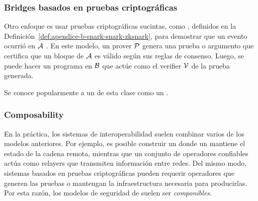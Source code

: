 \subsubsection{Bridges basados en pruebas criptográficas}

Otro enfoque es usar pruebas criptográficas sucintas, como \zkSNARK, definidos en la Definición~\ref{def:apendice-b-snark-snark-zksnark}, para demostrar que un evento ocurrió en $\mathcal{A}$ \cite{Xie2022}. En este modelo, un prover $\mathcal{P}$ genera una prueba o argumento que certifica que un bloque de $\mathcal{A}$ es válido según sus reglas de consenso. Luego, se puede hacer un programa en $\mathcal{B}$ que actúe como el verifier $\mathcal{V}$ de la prueba generada.

Se conoce popularmente a un \Bridge de esta clase como un \zkBridge.

\subsubsection{Composability}

En la práctica, los sistemas de interoperabilidad suelen combinar varios de los modelos anteriores. Por ejemplo, es posible construir un \Bridge donde un \LightClient mantiene el estado de la cadena remota, mientras que un conjunto de operadores confiables actúa como relayers que transmiten información entre redes. Del mismo modo, sistemas basados en pruebas criptográficas pueden requerir operadores que generen las pruebas o mantengan la infraestructura necesaria para producirlas. Por esta razón, los modelos de seguridad de \Bridges suelen ser \emph{componibles}.
